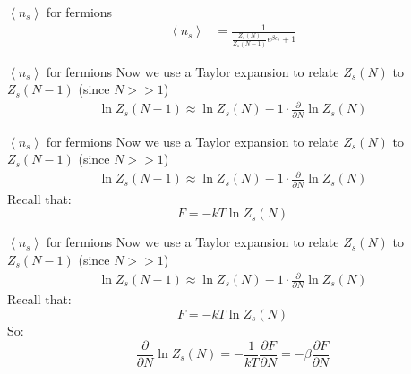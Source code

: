 \documentclass{beamer}
\begin{document}
\begin{frame}{$\left<n_s\right>$ for fermions}
	\begin{align*}
		\left<n_s\right>
		&=\frac{1}{\frac{Z_s(N)}{Z_s(N-1)}e^{\beta\epsilon_s}+1}
	\end{align*}
\end{frame}




\begin{frame}{$\left<n_s\right>$ for fermions}
	Now we use a Taylor expansion to relate $Z_s(N)$ to $Z_s(N-1)$ (since $N>>1$)
	\begin{align*}
		\ln{Z_s(N-1)}\approx \ln{Z_s(N)}-1\cdot\frac{\partial}{\partial N}\ln{Z_s(N)}
	\end{align*}

\end{frame}


\begin{frame}{$\left<n_s\right>$ for fermions}
	Now we use a Taylor expansion to relate $Z_s(N)$ to $Z_s(N-1)$ (since $N>>1$)
	\begin{align*}
		\ln{Z_s(N-1)}\approx \ln{Z_s(N)}-1\cdot\frac{\partial}{\partial N}\ln{Z_s(N)}
	\end{align*}
	Recall that:
	\begin{equation*}
		F=-kT\ln{Z_s(N)}
	\end{equation*}
	
\end{frame}



\begin{frame}{$\left<n_s\right>$ for fermions}
	Now we use a Taylor expansion to relate $Z_s(N)$ to $Z_s(N-1)$ (since $N>>1$)
	\begin{align*}
		\ln{Z_s(N-1)}\approx \ln{Z_s(N)}-1\cdot\frac{\partial}{\partial N}\ln{Z_s(N)}
	\end{align*}
	Recall that:
	\begin{equation*}
		F=-kT\ln{Z_s(N)}
	\end{equation*}
	So:
	\begin{equation*}
		\frac{\partial}{\partial N}\ln{Z_s(N)}=-\frac{1}{kT}\frac{\partial F}{\partial N}=-\beta\frac{\partial F}{\partial N}
	\end{equation*}
\end{frame}
\end{document}
